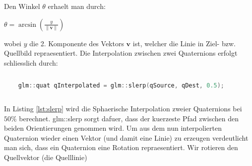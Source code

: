 Den Winkel $\theta$ erhaelt man durch:

$\theta = \arcsin \left(\frac{y}{\|\textbf{v}\|}\right)$

wobei $y$ die 2. Komponente des Vektors $\textbf{v}$ ist, welcher die Linie in Ziel- bzw. Quellbild repraesentiert.
Die Interpolation zwischen zwei Quaternions erfolgt schliesslich durch:
\begin{lstlisting}[language=C++, caption=Spherical interpolation zwischen zwei Quaternions, label={lst:slerp}, xleftmargin=0.5cm]
	
	glm::quat qInterpolated = glm::slerp(qSource, qDest, 0.5);
	
\end{lstlisting}
In Listing \ref{lst:slerp} wird die Sphaerische Interpolation
zweier Quaternions bei $50\%$ berechnet.
glm::slerp sorgt dafuer, dass der kuerzeste Pfad zwischen
den beiden Orientierungen genommen wird. Um aus dem nun
interpolierten Quaternion wieder einen Vektor (und damit
eine Linie) zu erzeugen verdeutlicht man sich, dass
ein Quaternion eine Rotation repraesentiert. Wir
rotieren den Quellvektor (die Quelllinie)




